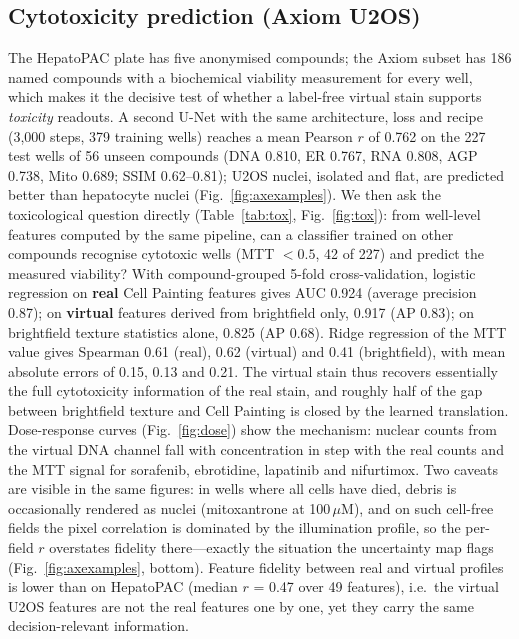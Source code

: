 \documentclass[11pt,a4paper]{article}
\begin{document}
\subsection{Cytotoxicity prediction (Axiom U2OS)}
The HepatoPAC plate has five anonymised compounds; the Axiom subset has 186 named compounds with a biochemical viability measurement for every well, which makes it the decisive test of whether a label-free virtual stain supports \emph{toxicity} readouts. A second U-Net with the same architecture, loss and recipe (3,000 steps, 379 training wells) reaches a mean Pearson $r$ of 0.762 on the 227 test wells of 56 unseen compounds (DNA 0.810, ER 0.767, RNA 0.808, AGP 0.738, Mito 0.689; SSIM 0.62--0.81); U2OS nuclei, isolated and flat, are predicted better than hepatocyte nuclei (Fig.~\ref{fig:axexamples}). We then ask the toxicological question directly (Table~\ref{tab:tox}, Fig.~\ref{fig:tox}): from well-level features computed by the same pipeline, can a classifier trained on other compounds recognise cytotoxic wells (MTT $<0.5$, 42 of 227) and predict the measured viability? With compound-grouped 5-fold cross-validation, logistic regression on \textbf{real} Cell Painting features gives AUC 0.924 (average precision 0.87); on \textbf{virtual} features derived from brightfield only, 0.917 (AP 0.83); on brightfield texture statistics alone, 0.825 (AP 0.68). Ridge regression of the MTT value gives Spearman 0.61 (real), 0.62 (virtual) and 0.41 (brightfield), with mean absolute errors of 0.15, 0.13 and 0.21. The virtual stain thus recovers essentially the full cytotoxicity information of the real stain, and roughly half of the gap between brightfield texture and Cell Painting is closed by the learned translation. Dose-response curves (Fig.~\ref{fig:dose}) show the mechanism: nuclear counts from the virtual DNA channel fall with concentration in step with the real counts and the MTT signal for sorafenib, ebrotidine, lapatinib and nifurtimox. Two caveats are visible in the same figures: in wells where all cells have died, debris is occasionally rendered as nuclei (mitoxantrone at 100\,$\mu$M), and on such cell-free fields the pixel correlation is dominated by the illumination profile, so the per-field $r$ overstates fidelity there---exactly the situation the uncertainty map flags (Fig.~\ref{fig:axexamples}, bottom). Feature fidelity between real and virtual profiles is lower than on HepatoPAC (median $r$ = 0.47 over 49 features), i.e.\ the virtual U2OS features are not the real features one by one, yet they carry the same decision-relevant information.
\end{document}
